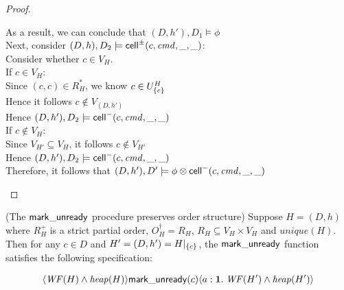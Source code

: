 \begin{proof}
\begin{tabbedproof}
\oo As a result, we can conclude that $(D,h'), D_1 \models \phi$ \\
\oo Next, consider $(D,h), D_2 \models \mathsf{cell}^{\pm}({c}, {\mathit{cmd}}, {\_}, {\_})$: \\
\ooo Consider whether $c \in V_H$. \\
\ooo If $c \in V_H$: \\
\oooo Since $(c, c) \in R^*_H$,  we know $c \in U^H_{\{{c}\}}$ \\
\oooo Hence it follows $c \not\in V_{(D, h')}$ \\
\oooo Hence $(D,h'), D_2 \models \mathsf{cell}^{-}({c}, {\mathit{cmd}}, {\_}, {\_})$ \\
\ooo If $c \not\in V_H$: \\
\oooo Since $V_{H'} \subseteq V_H$, it follows $c \not\in V_{H'}$ \\ 
\oooo Hence $(D,h'), D_2 \models \mathsf{cell}^{-}({c}, {\mathit{cmd}}, {\_}, {\_})$ \\
\oo Therefore, it follows that $(D,h'), D' \models \phi \otimes \mathsf{cell}^{-}({c}, {\mathit{cmd}}, {\_}, {\_})$ \\ 
\end{tabbedproof}
\end{proof}


\begin{lemma}{(The $\mathsf{mark\_unready}$ procedure preserves order structure)}
Suppose $H = (D,h)$ where $R^+_H$ is a strict partial order,
$O^\dagger_H = R_H$, $R_H \subseteq V_H \times V_H$ and
$\mathit{unique}(H)$. Then for any $c \in D$ and $H' = (D, h') =
H|_{\{{c}\}}$, the $\mathsf{mark\_unready}$ function satisfies the following specification:

\begin{displaymath}
\langle{\mathit{WF}(H) \land \mathit{heap}(H)}\rangle{\mathsf{mark\_unready}(c)}\langle{a:\mathbf{1}}.\;{\mathit{WF}(H') \land \mathit{heap}(H')}\rangle
\end{displaymath}
  
\end{lemma}

